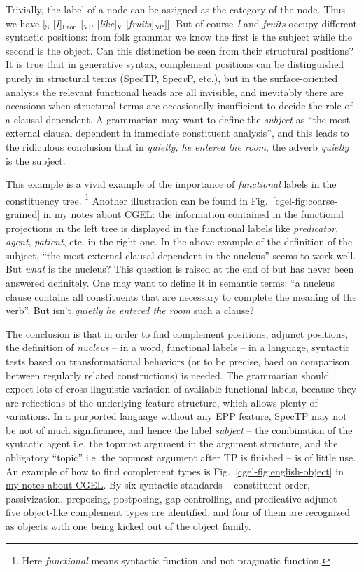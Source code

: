 \documentclass[UTF8, a4paper, oneside, scheme=plain]{ctexart}
\newcommand*{\citefig}[1]{Fig.~{#1}}
\newcommand*{\term}[1]{\emph{#1}}
\newcommand*{\corpus}[1]{\emph{#1}}
\newcommand*{\vP}{\textit{v}P}
\newcommand{\cgel}{\href{../English/cambridge.pdf}{my notes about CGEL}}
\begin{document}
Trivially, the label of a node can be assigned as the category of the node.
Thus we have 
{[$_{\text{S}}$ [\corpus{I}]$_{\text{Pron}}$ [$_{\text{VP}}$ [\corpus{like}]$_{\text{V}}$ [\corpus{fruits}]$_{\text{NP}}$]]}.
But of course \corpus{I} and \corpus{fruits} occupy different syntactic positions:
from folk grammar we know the first is the subject while the second is the object.
Can this distinction be seen from their structural positions?
It is true that in generative syntax,
complement positions can be distinguished purely in structural terms 
(SpecTP, Spec\vP, etc.),
but in the surface-oriented analysis the relevant functional heads are all invisible,
and inevitably there are occasions 
when structural terms are occasionally insufficient to decide the role of a clausal dependent.
A grammarian may want to define the \term{subject} as 
``the most external clausal dependent in immediate constituent analysis'',
and this leads to the ridiculous conclusion that 
in \corpus{quietly, he entered the room}, 
the adverb \corpus{quietly} is the subject.

This example is a vivid example of the importance of \emph{functional} labels in the constituency tree.%
\footnote{
    Here \term{functional} means syntactic function and not pragmatic function.
}
Another illustration can be found in \citefig{\ref{cgel-fig:coarse-grained}} in \cgel:
the information contained in the functional projections in the left tree 
is displayed in the functional labels like \term{predicator}, \term{agent}, \term{patient}, etc.
in the right one.
In the above example of the definition of the subject,
``the most external clausal dependent in the nucleus'' seems to work well.
But \emph{what} is the nucleus?
This question is raised at the end of  
but has never been answered definitely.
One may want to define it in semantic terms:
``a nucleus clause contains all constituents that are necessary to complete the meaning of the verb''.
But isn't \corpus{quietly he entered the room} such a clause?

The conclusion is that in order to find 
complement positions, adjunct positions, the definition of \term{nucleus} 
-- in a word, functional labels -- in a language, 
syntactic tests based on transformational behaviors 
(or to be precise, baed on comparison between regularly related constructions) is needed.
The grammarian should expect lots of cross-linguistic variation of available functional labels,
because they are reflections of the underlying feature structure,
which allows plenty of variations.
In a purported language without any EPP feature, SpecTP may not be not of much significance,
and hence the label \term{subject} 
-- the combination of the syntactic agent i.e. the topmost argument in the argument structure, 
and the obligatory ``topic'' i.e. the topmost argument after TP is finished --
is of little use.
An example of how to find complement types is \citefig{\ref{cgel-fig:english-object}} in \cgel.
By six syntactic standards 
-- constituent order, passivization, preposing, postposing, gap controlling, and predicative adjunct --
five object-like complement types are identified,
and four of them are recognized as objects with one being kicked out of the object family.
\end{document}
